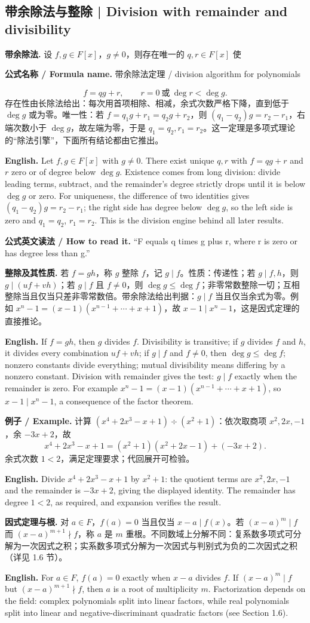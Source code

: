 \documentclass[UTF8,11pt,a4paper]{ctexart}
\newcommand{\EN}[1]{\par\noindent\textbf{English.} #1\par}
\newcommand{\READ}[1]{\par\noindent\textbf{公式英文读法 / How to read it.} #1\par}
\newcommand{\FORMULA}[2]{\par\noindent\textbf{公式名称 / Formula name.} #1 / #2\par}
\newcommand{\EX}[2]{\par\noindent\textbf{例子 / Example.} #1\par\EN{#2}}
\begin{document}
\subsection{带余除法与整除 | Division with remainder and divisibility}
\noindent\textbf{带余除法.} 设 $f,g\in F[x]$，$g\ne0$，则存在唯一的 $q,r\in F[x]$ 使
\FORMULA{带余除法定理}{division algorithm for polynomials}
\[
f=qg+r,\qquad r=0\ \text{或}\ \deg r<\deg g.
\]
存在性由长除法给出：每次用首项相除、相减，余式次数严格下降，直到低于 $\deg g$ 或为零。唯一性：若 $f=q_1g+r_1=q_2g+r_2$，则 $(q_1-q_2)g=r_2-r_1$，右端次数小于 $\deg g$，故左端为零，于是 $q_1=q_2,r_1=r_2$。这一定理是多项式理论的“除法引擎”，下面所有结论都由它推出。
\EN{Let $f,g\in F[x]$ with $g\ne0$. There exist unique $q,r$ with $f=qg+r$ and $r$ zero or of degree below $\deg g$. Existence comes from long division: divide leading terms, subtract, and the remainder's degree strictly drops until it is below $\deg g$ or zero. For uniqueness, the difference of two identities gives $(q_1-q_2)g=r_2-r_1$; the right side has degree below $\deg g$, so the left side is zero and $q_1=q_2$, $r_1=r_2$. This is the division engine behind all later results.}
\READ{``F equals q times g plus r, where r is zero or has degree less than g.''}
\noindent\textbf{整除及其性质.} 若 $f=gh$，称 $g$ 整除 $f$，记 $g\mid f$。性质：传递性；若 $g\mid f,h$，则 $g\mid(uf+vh)$；若 $g\mid f$ 且 $f\ne0$，则 $\deg g\le\deg f$；非零常数整除一切；互相整除当且仅当只差非零常数倍。带余除法给出判据：$g\mid f$ 当且仅当余式为零。例如 $x^n-1=(x-1)(x^{n-1}+\cdots+x+1)$，故 $x-1\mid x^n-1$，这是因式定理的直接推论。
\EN{If $f=gh$, then $g$ divides $f$. Divisibility is transitive; if $g$ divides $f$ and $h$, it divides every combination $uf+vh$; if $g\mid f$ and $f\ne0$, then $\deg g\le\deg f$; nonzero constants divide everything; mutual divisibility means differing by a nonzero constant. Division with remainder gives the test: $g\mid f$ exactly when the remainder is zero. For example $x^n-1=(x-1)(x^{n-1}+\cdots+x+1)$, so $x-1\mid x^n-1$, a consequence of the factor theorem.}
\EX{计算 $(x^4+2x^3-x+1)\div(x^2+1)$：依次取商项 $x^2,2x,-1$，余 $-3x+2$，故
\[
x^4+2x^3-x+1=(x^2+1)(x^2+2x-1)+(-3x+2).
\]
余式次数 $1<2$，满足定理要求；代回展开可检验。}{Divide $x^4+2x^3-x+1$ by $x^2+1$: the quotient terms are $x^2,2x,-1$ and the remainder is $-3x+2$, giving the displayed identity. The remainder has degree $1<2$, as required, and expansion verifies the result.}
\noindent\textbf{因式定理与根.} 对 $a\in F$，$f(a)=0$ 当且仅当 $x-a\mid f(x)$。若 $(x-a)^m\mid f$ 而 $(x-a)^{m+1}\nmid f$，称 $a$ 是 $m$ 重根。不同数域上分解不同：复系数多项式可分解为一次因式之积；实系数多项式分解为一次因式与判别式为负的二次因式之积（详见 1.6 节）。
\EN{For $a\in F$, $f(a)=0$ exactly when $x-a$ divides $f$. If $(x-a)^m\mid f$ but $(x-a)^{m+1}\nmid f$, then $a$ is a root of multiplicity $m$. Factorization depends on the field: complex polynomials split into linear factors, while real polynomials split into linear and negative-discriminant quadratic factors (see Section 1.6).}
\end{document}
